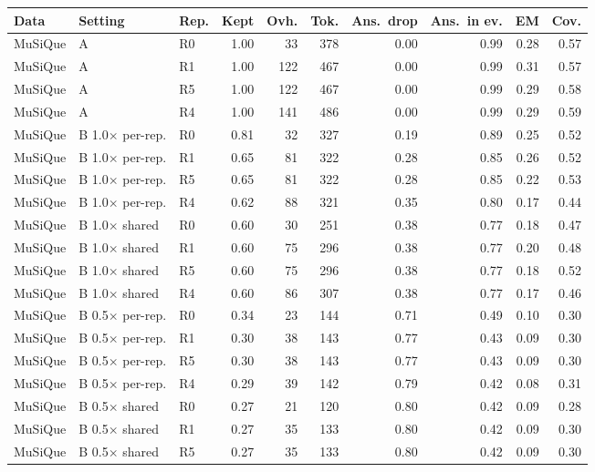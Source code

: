\begin{table}[t]
\centering
\footnotesize
\begin{adjustbox}{max width=\linewidth}
\begin{tabular}{@{}lllrrrrrrr@{}}
\toprule
Data & Setting & Rep. & Kept & Ovh. & Tok. & Ans.\ drop & Ans.\ in ev. & EM & Cov. \\
\midrule
MuSiQue & A & R0 & 1.00 & 33 & 378 & 0.00 & 0.99 & 0.28 & 0.57 \\
MuSiQue & A & R1 & 1.00 & 122 & 467 & 0.00 & 0.99 & 0.31 & 0.57 \\
MuSiQue & A & R5 & 1.00 & 122 & 467 & 0.00 & 0.99 & 0.29 & 0.58 \\
MuSiQue & A & R4 & 1.00 & 141 & 486 & 0.00 & 0.99 & 0.29 & 0.59 \\
MuSiQue & B 1.0$\times$ per-rep. & R0 & 0.81 & 32 & 327 & 0.19 & 0.89 & 0.25 & 0.52 \\
MuSiQue & B 1.0$\times$ per-rep. & R1 & 0.65 & 81 & 322 & 0.28 & 0.85 & 0.26 & 0.52 \\
MuSiQue & B 1.0$\times$ per-rep. & R5 & 0.65 & 81 & 322 & 0.28 & 0.85 & 0.22 & 0.53 \\
MuSiQue & B 1.0$\times$ per-rep. & R4 & 0.62 & 88 & 321 & 0.35 & 0.80 & 0.17 & 0.44 \\
MuSiQue & B 1.0$\times$ shared & R0 & 0.60 & 30 & 251 & 0.38 & 0.77 & 0.18 & 0.47 \\
MuSiQue & B 1.0$\times$ shared & R1 & 0.60 & 75 & 296 & 0.38 & 0.77 & 0.20 & 0.48 \\
MuSiQue & B 1.0$\times$ shared & R5 & 0.60 & 75 & 296 & 0.38 & 0.77 & 0.18 & 0.52 \\
MuSiQue & B 1.0$\times$ shared & R4 & 0.60 & 86 & 307 & 0.38 & 0.77 & 0.17 & 0.46 \\
MuSiQue & B 0.5$\times$ per-rep. & R0 & 0.34 & 23 & 144 & 0.71 & 0.49 & 0.10 & 0.30 \\
MuSiQue & B 0.5$\times$ per-rep. & R1 & 0.30 & 38 & 143 & 0.77 & 0.43 & 0.09 & 0.30 \\
MuSiQue & B 0.5$\times$ per-rep. & R5 & 0.30 & 38 & 143 & 0.77 & 0.43 & 0.09 & 0.30 \\
MuSiQue & B 0.5$\times$ per-rep. & R4 & 0.29 & 39 & 142 & 0.79 & 0.42 & 0.08 & 0.31 \\
MuSiQue & B 0.5$\times$ shared & R0 & 0.27 & 21 & 120 & 0.80 & 0.42 & 0.09 & 0.28 \\
MuSiQue & B 0.5$\times$ shared & R1 & 0.27 & 35 & 133 & 0.80 & 0.42 & 0.09 & 0.30 \\
MuSiQue & B 0.5$\times$ shared & R5 & 0.27 & 35 & 133 & 0.80 & 0.42 & 0.09 & 0.30 \\

\end{tabular}
\end{adjustbox}
\end{table}
